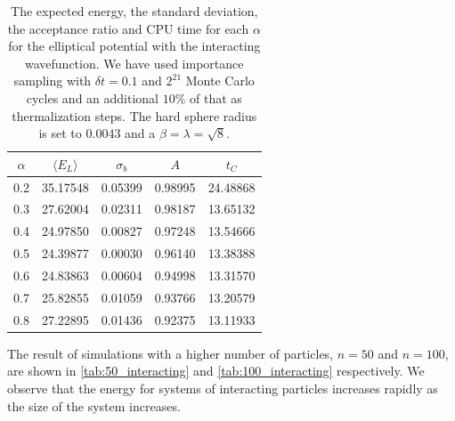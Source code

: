 \documentclass[
    a4paper, aps, twocolumn, floatfix, superscriptaddress, nofootinbib]{revtex4-1}
\newcommand{\1}{\mathds{1}}
\begin{document}
         \begin{table}
             \caption{The expected energy, the standard
             deviation, the acceptance ratio and CPU time for each $\alpha$
             for the elliptical potential with the interacting wavefunction. We
             have used importance sampling with $\delta t = 0.1$ and $2^{21}$
             Monte Carlo cycles and an additional $10\%$ of that as
             thermalization steps. The hard sphere radius is set to $0.0043$ and
             a $\beta = \lambda = \sqrt{8}$.}
             \centering
             \begin{ruledtabular}
                 \begin{tabular}{ccccc}
                     $\alpha$ & $\langle  E_L\rangle$ & $\sigma_b$
                     &$A$&$t_C$ \\
                     \hline
                     0.2&35.17548&0.05399&0.98995&24.48868\\
                     0.3&27.62004&0.02311&0.98187&13.65132\\
                     0.4&24.97850&0.00827&0.97248&13.54666\\
                     0.5&24.39877&0.00030&0.96140&13.38388\\
                     0.6&24.83863&0.00604&0.94998&13.31570\\
                     0.7&25.82855&0.01059&0.93766&13.20579\\
                     0.8&27.22895&0.01436&0.92375&13.11933\\
                 \end{tabular}
             \end{ruledtabular}
             \label{tab:10_interacting}
         \end{table}
 
		The result of simulations with a higher number of particles, $n=50$ and $n=100$, are  shown in \autoref{tab:50_interacting}
		and \autoref{tab:100_interacting} respectively. We observe that the energy for systems of interacting particles increases
		rapidly as the size of the system increases. 
 
\end{document}

